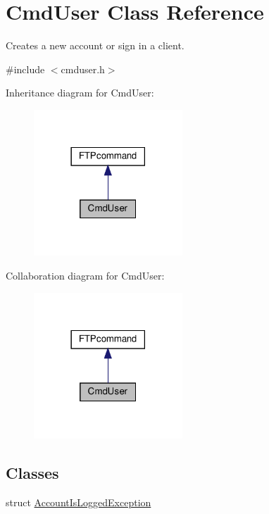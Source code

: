 \hypertarget{classCmdUser}{}\section{Cmd\+User Class Reference}
\label{classCmdUser}


Creates a new account or sign in a client.  




{\ttfamily \#include $<$cmduser.\+h$>$}



Inheritance diagram for Cmd\+User\+:
\nopagebreak
\begin{figure}[H]
\begin{center}
\leavevmode
\includegraphics[width=158pt]{classCmdUser__inherit__graph}
\end{center}
\end{figure}


Collaboration diagram for Cmd\+User\+:
\nopagebreak
\begin{figure}[H]
\begin{center}
\leavevmode
\includegraphics[width=158pt]{classCmdUser__coll__graph}
\end{center}
\end{figure}
\subsection*{Classes}
\begin{DoxyCompactItemize}
\item 
struct \hyperlink{structCmdUser_1_1AccountIsLoggedException}{Account\+Is\+Logged\+Exception}
\end{DoxyCompactItemize}
